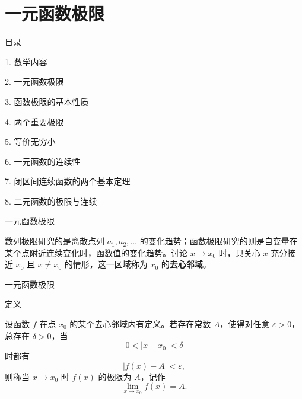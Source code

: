 \documentclass[aspectratio=169,10pt,fontset=fandol]{ctexbeamer}
\begin{document}
\section{一元函数极限}
\begin{frame}[t,fragile]{目录}
\normalsize
{\color{black}\normalsize 1. 数学内容\par}\vspace{0.3em}
{\color{blue}\normalsize 2. 一元函数极限\par}\vspace{0.3em}
{\color{gray!40}\normalsize 3. 函数极限的基本性质\par}\vspace{0.3em}
{\color{gray!40}\normalsize 4. 两个重要极限\par}\vspace{0.3em}
{\color{gray!40}\normalsize 5. 等价无穷小\par}\vspace{0.3em}
{\color{gray!40}\normalsize 6. 一元函数的连续性\par}\vspace{0.3em}
{\color{gray!40}\normalsize 7. 闭区间连续函数的两个基本定理\par}\vspace{0.3em}
{\color{gray!40}\normalsize 8. 二元函数的极限与连续\par}\vspace{0.3em}
\end{frame}
\begin{frame}[t,fragile]{一元函数极限}
\normalsize
{\normalsize
数列极限研究的是离散点列 \(a_1,a_2,\ldots\) 的变化趋势；函数极限研究的则是自变量在某个点附近连续变化时，函数值的变化趋势。讨论 \(x\to x_0\) 时，只关心 \(x\) 充分接近 \(x_0\) 且 \(x\neq x_0\) 的情形，这一区域称为 \(x_0\) 的\textbf{去心邻域}。


}
\end{frame}
\begin{frame}[t,fragile]{一元函数极限}
\normalsize
\begin{block}{定义}
{\normalsize

设函数 \(f\) 在点 \(x_0\) 的某个去心邻域内有定义。若存在常数 \(A\)，使得对任意 \(\varepsilon>0\)，总存在 \(\delta>0\)，当
\[
0<|x-x_0|<\delta
\]
时都有
\[
|f(x)-A|<\varepsilon,
\]
则称当 \(x\to x_0\) 时 \(f(x)\) 的极限为 \(A\)，记作
\[
\lim_{x\to x_0}f(x)=A.
\]

}
\end{block}
\end{frame}
\end{document}
